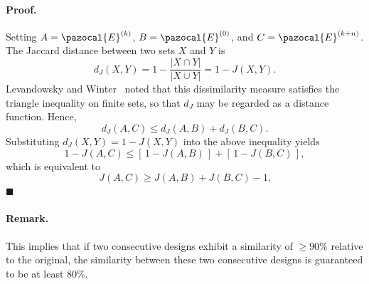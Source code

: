 \documentclass[a4paper,fleqn]{cas-sc}
\begin{document}
\paragraph{Proof.}
Setting $A=\pazocal{E}^{(k)}$, $B=\pazocal{E}^{(0)}$, and $C=\pazocal{E}^{(k+n)}$.
The Jaccard distance between two sets $X$ and $Y$ is
\[
d_J(X,Y)=1-\frac{|X\cap Y|}{|X\cup Y|}=1-J(X,Y).
\]
Levandowsky and Winter~\citep{levandowsky1971distance} noted that this
dissimilarity measure satisfies the triangle inequality on finite sets,
so that $d_J$ may be regarded as a distance function. Hence,
\[
d_J(A,C)\le d_J(A,B)+d_J(B,C).
\]
Substituting $d_J(X,Y)=1-J(X,Y)$ into the above inequality yields
\[
1-J(A,C)
\le [\,1-J(A,B)\,]+[\,1-J(B,C)\,],
\]
which is equivalent to
\[
J(A,C)\ge J(A,B)+J(B,C)-1.
\]
\hfill$\blacksquare$

\paragraph{Remark.}
This implies that if two consecutive designs exhibit a similarity of $\geq 90\%$ relative to the original, the similarity between these two consecutive designs is guaranteed to be at least 80\%.
%
\end{document}

